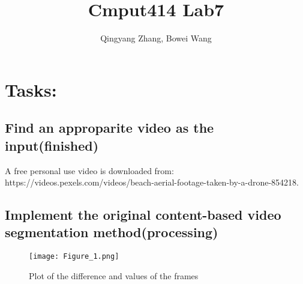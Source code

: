 \documentclass[11pt]{article} %
\title{Cmput414 Lab7}
\author{Qingyang Zhang, Bowei Wang}
\begin{document}
\maketitle

\section{Tasks:}






\subsection{Find an approparite video as the input(finished)}
A free personal use video is downloaded from:\\ https://videos.pexels.com/videos/beach-aerial-footage-taken-by-a-drone-854218.
\subsection{Implement the original content-based video segmentation method(processing)}

\begin{figure}
  \centering
  \texttt{[image: Figure\_1.png]} %
  \caption{Plot of the difference and values of the frames} %
  \label{plot} %
\end{figure}
\end{document}
